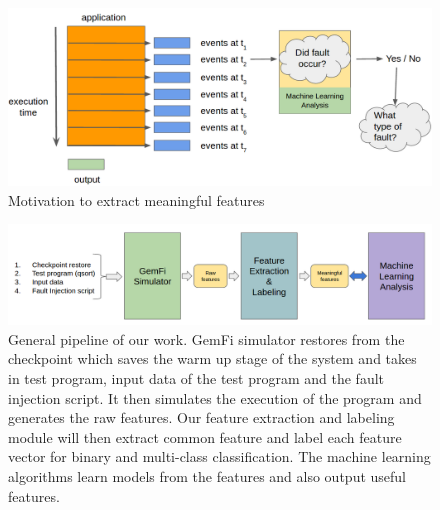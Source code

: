 \begin{figure}[t]
\begin{center}
   \includegraphics[width=0.95\linewidth]{./figures/teaser.png}
\end{center}
   \caption{\footnotesize Motivation to extract meaningful features}
\vspace{-0.5cm}
\label{fig:teaser}
\end{figure}

\begin{figure}[t]
\begin{center}
   \includegraphics[width=0.95\linewidth]{./figures/pipeline.png}
\end{center}
   \caption{\footnotesize General pipeline of our work. GemFi simulator restores from the checkpoint which saves the warm up stage of the system and takes in test program, input data of the test program and the fault injection script. It then simulates the execution of the program and generates the raw features. Our feature extraction and labeling module will then extract common feature and label each feature vector for binary and multi-class classification. The machine learning algorithms learn models from the features and also output useful features.}
\label{fig:pipeline}
\end{figure}



